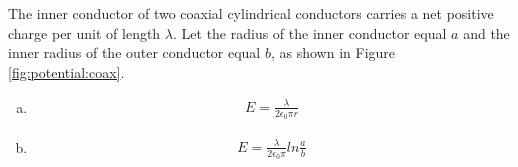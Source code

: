 \question The inner conductor of two coaxial cylindrical conductors carries a net positive charge per unit of length $\lambda$. Let the radius of the inner conductor equal $a$ and the inner radius of the outer conductor equal $b$, as shown in Figure \ref{fig:potential:coax}.
\begin{finalanswer}
\begin{enumerate}[(a)]
\item \begin{align*}
E=\frac{\lambda}{2\epsilon_0\pi r}
\end{align*}
\item \begin{align*}
E=\frac{\lambda}{2\epsilon_0\pi}ln\frac{a}{b}
\end{align*}
\end{enumerate}
\end{finalanswer}
